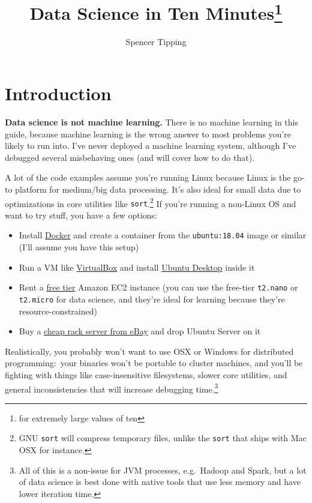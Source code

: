 \documentclass{article}
\title{Data Science in Ten Minutes\footnote{for extremely large values of ten}}
\author{Spencer Tipping}
\newcommand{\lnk}[2]{\href{#1}{\textcolor[rgb]{1.0,0.0,0.0}{#2}}}
\begin{document}
  \maketitle
  \tableofcontents

  \section{Introduction}
  {\bf Data science is not machine learning.} There is no machine learning in
  this guide, because machine learning is the wrong answer to most problems
  you're likely to run into. I've never deployed a machine learning system,
  although I've debugged several misbehaving ones (and will cover how to do
  that).

  A lot of the code examples assume you're running Linux because Linux is the
  go-to platform for medium/big data processing. It's also ideal for small data
  due to optimizations in core utilities like {\tt sort}.\footnote{GNU {\tt sort}
  will compress temporary files, unlike the {\tt sort} that ships with Mac OSX
  for instance.} If you're running a non-Linux OS and want to try stuff, you
  have a few options:

  \begin{itemize}
    \item Install \lnk{https://docker.com}{Docker} and create a container from
          the {\tt ubuntu:18.04} image or similar (I'll assume you have this
          setup)
    \item Run a VM like \lnk{https://www.virtualbox.org/}{VirtualBox} and
          install \lnk{https://www.ubuntu.com/desktop}{Ubuntu Desktop} inside it
    \item Rent a \lnk{https://aws.amazon.com/free/}{free tier} Amazon EC2
          instance (you can use the free-tier {\tt t2.nano} or {\tt t2.micro}
          for data science, and they're ideal for learning because they're
          resource-constrained)
    \item Buy a
          \lnk{https://github.com/spencertipping/www/blob/master/datacenter.md}{cheap
          rack server from eBay} and drop Ubuntu Server on it
  \end{itemize}

  Realistically, you probably won't want to use OSX or Windows for distributed
  programming:~your binaries won't be portable to cluster machines, and you'll
  be fighting with things like case-insensitive filesystems, slower core
  utilities, and general inconsistencies that will increase debugging
  time.\footnote{All of this is a non-issue for JVM processes, e.g.~Hadoop and
  Spark, but a lot of data science is best done with native tools that use less
  memory and have lower iteration time.}
\end{document}
